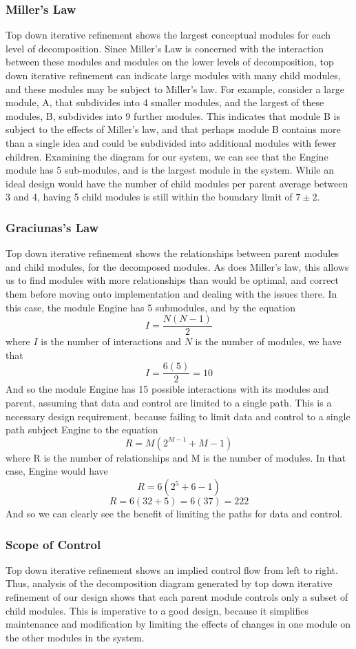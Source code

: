 \documentclass{article}
\begin{document}
		\subsubsection{Miller's Law}
			Top down iterative refinement shows the largest conceptual modules for each level of decomposition. Since Miller's Law is concerned with the interaction between these modules and modules on the lower levels of decomposition, top down iterative refinement can indicate large modules with many child modules, and these modules may be subject to Miller's law. For example, consider a large module, A,  that subdivides into 4 smaller modules, and the largest of these modules, B, subdivides into 9 further modules. This indicates that module B is subject to the effects of Miller's law, and that perhaps module B contains more than a single idea and could be subdivided into additional modules with fewer children. Examining the diagram for our system, we can see that the Engine module has 5 sub-modules, and is the largest module in the system. While an ideal design would have the number of child modules per parent average between 3 and 4, having 5 child modules is still within the boundary limit of $7\pm2$. 
		\subsubsection{Graciunas's Law}
			Top down iterative refinement shows the relationships between parent modules and child modules, for the decomposed modules. As does Miller's law, this allows us to find modules with more relationships than would be optimal, and correct them before moving onto implementation and dealing with the issues there. In this case, the module Engine has 5 submodules, and by the equation 
			$$I = \frac{N(N - 1)}{2}$$
			where $I$ is the number of interactions and $N$ is the number of modules, we have that
			$$I = \frac{6(5)}{2} = 10$$
			And so the module Engine has 15 possible interactions with its modules and parent, assuming that data and control are limited to a single path. This is a necessary design requirement, because failing to limit data and control to a single path subject Engine to the equation
			$$R = M(2^{M-1} + M - 1)$$
			where R is the number of relationships and M is the number of modules. In that case, Engine would have 
			$$R = 6(2^5 + 6 - 1)$$
			$$R = 6(32 + 5) = 6(37) = 222$$
			And so we can clearly see the benefit of limiting the paths for data and control.  
		\subsubsection{Scope of Control}
			Top down iterative refinement shows an implied control flow from left to right. Thus, analysis of the decomposition diagram generated by top down iterative refinement of our design shows that each parent module controls only a subset of child modules. This is imperative to a good design, because it simplifies maintenance and modification by limiting the effects of changes in one module on the other modules in the system. 
\end{document}
